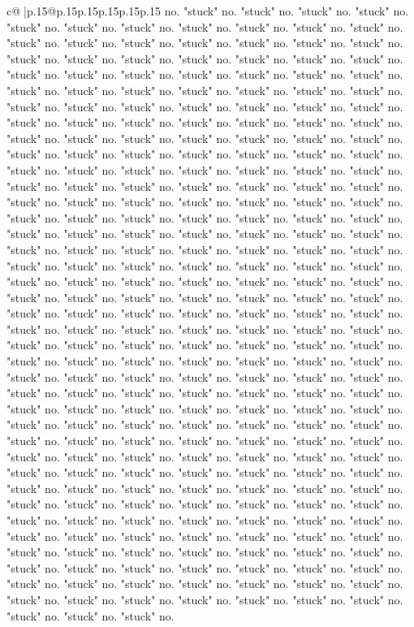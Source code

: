 \documentclass{article}
\begin{document}
{\begin{supertabular}{c@{$\;$}|p{.15\linewidth}@{}p{.15\linewidth}p{.15\linewidth}p{.15\linewidth}p{.15\linewidth}p{.15\linewidth}}
{{{no. "stuck" no. "stuck" no. "stuck" no. "stuck" no. "stuck" no. "stuck" no. "stuck" no. "stuck" no. "stuck" no. "stuck" no. "stuck" no. "stuck" no. "stuck" no. "stuck" no. "stuck" no. "stuck" no. "stuck" no. "stuck" no. "stuck" no. "stuck" no. "stuck" no. "stuck" no. "stuck" no. "stuck" no. "stuck" no. "stuck" no. "stuck" no. "stuck" no. "stuck" no. "stuck" no. "stuck" no. "stuck" no. "stuck" no. "stuck" no. "stuck" no. "stuck" no. "stuck" no. "stuck" no. "stuck" no. "stuck" no. "stuck" no. "stuck" no. "stuck" no. "stuck" no. "stuck" no. "stuck" no. "stuck" no. "stuck" no. "stuck" no. "stuck" no. "stuck" no. "stuck" no. "stuck" no. "stuck" no. "stuck" no. "stuck" no. "stuck" no. "stuck" no. "stuck" no. "stuck" no. "stuck" no. "stuck" no. "stuck" no. "stuck" no. "stuck" no. "stuck" no. "stuck" no. "stuck" no. "stuck" no. "stuck" no. "stuck" no. "stuck" no. "stuck" no. "stuck" no. "stuck" no. "stuck" no. "stuck" no. "stuck" no. "stuck" no. "stuck" no. "stuck" no. "stuck" no. "stuck" no. "stuck" no. "stuck" no. "stuck" no. "stuck" no. "stuck" no. "stuck" no. "stuck" no. "stuck" no. "stuck" no. "stuck" no. "stuck" no. "stuck" no. "stuck" no. "stuck" no. "stuck" no. "stuck" no. "stuck" no. "stuck" no. "stuck" no. "stuck" no. "stuck" no. "stuck" no. "stuck" no. "stuck" no. "stuck" no. "stuck" no. "stuck" no. "stuck" no. "stuck" no. "stuck" no. "stuck" no. "stuck" no. "stuck" no. "stuck" no. "stuck" no. "stuck" no. "stuck" no. "stuck" no. "stuck" no. "stuck" no. "stuck" no. "stuck" no. "stuck" no. "stuck" no. "stuck" no. "stuck" no. "stuck" no. "stuck" no. "stuck" no. "stuck" no. "stuck" no. "stuck" no. "stuck" no. "stuck" no. "stuck" no. "stuck" no. "stuck" no. "stuck" no. "stuck" no. "stuck" no. "stuck" no. "stuck" no. "stuck" no. "stuck" no. "stuck" no. "stuck" no. "stuck" no. "stuck" no. "stuck" no. "stuck" no. "stuck" no. "stuck" no. "stuck" no. "stuck" no. "stuck" no. "stuck" no. "stuck" no. "stuck" no. "stuck" no. "stuck" no. "stuck" no. "stuck" no. "stuck" no. "stuck" no. "stuck" no. "stuck" no. "stuck" no. "stuck" no. "stuck" no. "stuck" no. "stuck" no. "stuck" no. "stuck" no. "stuck" no. "stuck" no. "stuck" no. "stuck" no. "stuck" no. "stuck" no. "stuck" no. "stuck" no. "stuck" no. "stuck" no. "stuck" no. "stuck" no. "stuck" no. "stuck" no. "stuck" no. "stuck" no. "stuck" no. "stuck" no. "stuck" no. "stuck" no. "stuck" no. "stuck" no. "stuck" no. "stuck" no. "stuck" no. "stuck" no. "stuck" no. "stuck" no. "stuck" no. "stuck" no. "stuck" no. "stuck" no. "stuck" no. "stuck" no. "stuck" no. "stuck" no. "stuck" no. "stuck" no. "stuck" no. "stuck" no. "stuck" no. "stuck" no. "stuck" no. "stuck" no. "stuck" no. "stuck" no. "stuck" no. "stuck" no. "stuck" no. "stuck" no. "stuck" no. "stuck" no. "stuck" no. "stuck" no. "stuck" no. "stuck" no. "stuck" no. "stuck" no. "stuck" no. "stuck" no. "stuck" no. "stuck" no. "stuck" no. "stuck" no. "stuck" no. "stuck" no. "stuck" no. "stuck" no. "stuck" no. "stuck" no. "stuck" no. "stuck" no. "stuck" no. "stuck" no. "stuck" no. "stuck" no. "stuck" no. "stuck" no. "stuck" no. "stuck" no. "stuck" no. "stuck" no. "stuck" no. "stuck" no. "stuck" no. "stuck" no. "stuck" no. "stuck" no. "stuck" no. "stuck" no. }}}
\end{supertabular}}
\end{document}
